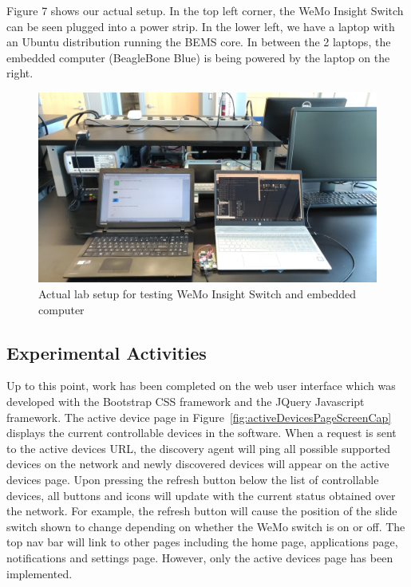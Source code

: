 \documentclass[letterpaper,12pt]{article}   %
\begin{document}
Figure 7 shows our actual setup. In the top left corner, the WeMo Insight Switch can be seen plugged into a power strip. In the lower left, we have a laptop with an Ubuntu distribution running the BEMS core. In between the 2 laptops, the embedded computer (BeagleBone Blue) is being powered by the laptop on the right.

\begin{figure}[H]
    \centering
    \includegraphics[scale=0.09]{figs/experimentalLabSetup.jpg}
    \caption{Actual lab setup for testing WeMo Insight Switch and embedded computer}
    \label{fig:expLabSetup}
\end{figure}

\subsection{Experimental Activities} \label{sec:expresults}
Up to this point, work has been completed on the web user interface which was developed with the Bootstrap CSS framework and the JQuery Javascript framework. The active device page in Figure~\ref{fig:activeDevicesPageScreenCap} displays the current controllable devices in the software. When a request is sent to the active devices URL, the discovery agent will ping all possible supported devices on the network and newly discovered devices will appear on the active devices page. Upon pressing the refresh button below the list of controllable devices, all buttons and icons will update with the current status obtained over the network. For example, the refresh button will cause the position of the slide switch shown to change depending on whether the WeMo switch is on or off. The top nav bar will link to other pages including the home page, applications page, notifications and settings page. However, only the active devices page has been implemented.
\end{document}
